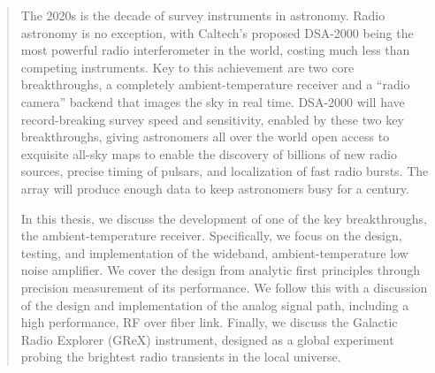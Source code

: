 \begin{abstract}
   The 2020s is the decade of survey instruments in astronomy.
   Radio astronomy is no exception, with Caltech's proposed DSA-2000 being the most powerful radio interferometer in the world, costing much less than competing instruments.
   Key to this achievement are two core breakthroughs, a completely ambient-temperature receiver and a ``radio camera'' backend that images the sky in real time.
   DSA-2000 will have record-breaking survey speed and sensitivity, enabled by these two key breakthroughs, giving astronomers all over the world open access to exquisite all-sky maps to enable the discovery of billions of new radio sources, precise timing of pulsars, and localization of fast radio bursts.
   The array will produce enough data to keep astronomers busy for a century.

   In this thesis, we discuss the development of one of the key breakthroughs, the ambient-temperature receiver.
   Specifically, we focus on the design, testing, and implementation of the wideband, ambient-temperature low noise amplifier.
   We cover the design from analytic first principles through precision measurement of its performance.
   We follow this with a discussion of the design and implementation of the analog signal path, including a high performance, RF over fiber link.
   Finally, we discuss the Galactic Radio Explorer (GReX) instrument, designed as a global experiment probing the brightest radio transients in the local universe.
\end{abstract}